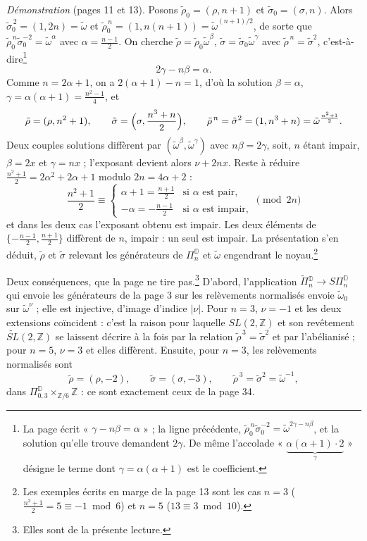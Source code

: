 \documentclass[11pt,a4paper]{article}
\begin{document}
\emph{Démonstration} (pages 11 et 13). Posons $\tilde\rho_0 = (\rho, n+1)$ et
$\tilde\sigma_0 = (\sigma, n)$. Alors $\tilde\sigma_0^{\,2} = (1, 2n) =
\tilde\omega$ et $\tilde\rho_0^{\,n} = (1, n(n+1)) = \tilde\omega^{(n+1)/2}$, de
sorte que $\tilde\rho_0^{\,n}\tilde\sigma_0^{-2} = \tilde\omega^{\alpha}$ avec
$\alpha = \frac{n-1}{2}$. On cherche $\tilde\rho = \tilde\rho_0\tilde\omega^{\beta}$,
$\tilde\sigma = \tilde\sigma_0\tilde\omega^{\gamma}$ avec
$\tilde\rho^{\,n} = \tilde\sigma^2$, c'est-à-dire\footnote{La page écrit « $\gamma - n\beta = \alpha$ » ; la ligne précédente,
$\tilde\rho_0^{\,n}\tilde\sigma_0^{-2} = \tilde\omega^{2\gamma - n\beta}$, et la
solution qu'elle trouve demandent $2\gamma$. De même l'accolade
« $\underbrace{\alpha(\alpha+1)\cdot 2}_{\gamma}$ » désigne le terme dont
$\gamma = \alpha(\alpha+1)$ est le coefficient.}
\[
2\gamma - n\beta = \alpha .
\]
 Comme $n = 2\alpha + 1$, on a
$2(\alpha + 1) - n = 1$, d'où la solution $\beta = \alpha$,
$\gamma = \alpha(\alpha+1) = \frac{n^2-1}{4}$, et
\[
\tilde\rho = (\rho, n^2 + 1), \qquad
\tilde\sigma = \Bigl(\sigma, \frac{n^3+n}{2}\Bigr), \qquad
\tilde\rho^{\,n} = \tilde\sigma^2 = (1, n^3 + n) = \tilde\omega^{\frac{n^2+1}{2}} .
\]
Deux couples solutions diffèrent par $(\tilde\omega^{\beta}, \tilde\omega^{\gamma})$
avec $n\beta = 2\gamma$, soit, $n$ étant impair, $\beta = 2x$ et $\gamma = nx$ ;
l'exposant devient alors $\nu + 2nx$. Reste à réduire $\frac{n^2+1}{2} =
2\alpha^2 + 2\alpha + 1$ modulo $2n = 4\alpha + 2$ :
\[
\frac{n^2+1}{2} \equiv
\begin{cases}
\alpha + 1 = \frac{n+1}{2} & \text{si } \alpha \text{ est pair}, \\[2pt]
-\alpha = -\frac{n-1}{2} & \text{si } \alpha \text{ est impair},
\end{cases}
\pmod{2n}
\]
et dans les deux cas l'exposant obtenu est impair. Les deux éléments de
$\{-\frac{n-1}{2}, \frac{n+1}{2}\}$ diffèrent de $n$, impair : un seul est impair.
La présentation s'en déduit, $\tilde\rho$ et $\tilde\sigma$ relevant les
générateurs de $\Pi^{\mathbb{D}}_n$ et $\tilde\omega$ engendrant le
noyau.\footnote{Les exemples écrits en marge de la page 13 sont les cas $n = 3$
($\frac{n^2+1}{2} = 5 \equiv -1 \bmod 6$) et $n = 5$ ($13 \equiv 3 \bmod 10$).}

Deux conséquences, que la page ne tire pas.\footnote{Elles sont de la présente
lecture.} D'abord, l'application $\widetilde{\Pi}{}^{\mathbb{D}}_n \to
S\Pi^{\mathbb{D}}_n$ qui envoie les générateurs de la page 3 sur les relèvements
normalisés envoie $\tilde\omega_0$ sur $\tilde\omega^{\nu}$ ; elle est injective,
d'image d'indice $|\nu|$. Pour $n = 3$, $\nu = -1$ et les deux extensions
coïncident : c'est la raison pour laquelle $SL(2, \mathbb{Z})$ et son revêtement
$\widetilde{SL}(2, \mathbb{Z})$ se laissent décrire à la fois par la relation
$\tilde\rho^{\,3} = \tilde\sigma^2$ et par l'abélianisé ; pour $n = 5$, $\nu = 3$
et elles diffèrent. Ensuite, pour $n = 3$, les relèvements normalisés sont
\[
\tilde\rho = (\rho, -2), \qquad \tilde\sigma = (\sigma, -3), \qquad
\tilde\rho^{\,3} = \tilde\sigma^2 = \tilde\omega^{-1} ,
\]
dans $\Pi^{\mathbb{D}}_{0,3} \times_{\mathbb{Z}/6} \mathbb{Z}$ : ce sont exactement
ceux de la page 34.
\end{document}
